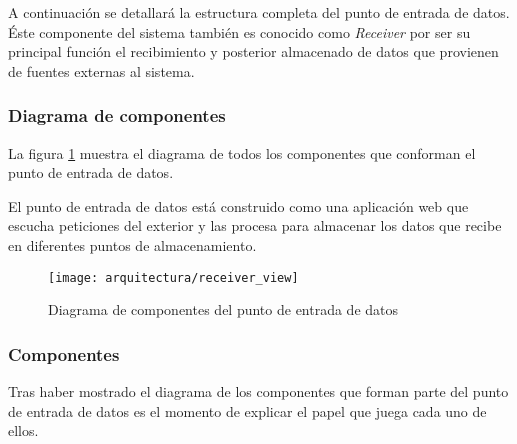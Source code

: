 A continuación se detallará la estructura completa del punto de entrada de datos.  Éste componente del sistema también es conocido como \textit{Receiver} por ser su principal función el recibimiento y posterior almacenado de datos que provienen de fuentes externas al sistema.


\subsubsection{Diagrama de componentes}
La figura \ref{fig:diagrama_componentes_receiver} muestra el diagrama de todos los componentes que conforman el punto de entrada de datos.

El punto de entrada de datos está construido como una aplicación web que escucha peticiones del exterior y las procesa para almacenar los datos que recibe en diferentes puntos de almacenamiento.
\begin{landscape}
	\begin{figure}[ht]
		\centering
		\texttt{[image: arquitectura/receiver\_view]}
		\caption{Diagrama de componentes del punto de entrada de datos}
		\label{fig:diagrama_componentes_receiver}
	\end{figure}
\end{landscape}


\subsubsection{Componentes}
Tras haber mostrado el diagrama de los componentes que forman parte del punto de entrada de datos es el momento de explicar el papel que juega cada uno de ellos.

